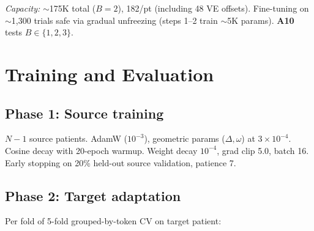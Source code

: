 \documentclass[11pt,letterpaper]{article}
\begin{document}
\textcolor{BrickRed}{\textit{Capacity:}} ${\sim}$175K total ($B{=}2$), 182/pt (including 48 VE offsets). Fine-tuning on ${\sim}$1{,}300 trials safe via gradual unfreezing (steps 1--2 train ${\sim}$5K params). \textbf{A10} tests $B \in \{1, 2, 3\}$.



\section{Training and Evaluation}\label{sec:training}

\subsection{Phase 1: Source training}

$N{-}1$ source patients. AdamW ($10^{-3}$), geometric params ($\Delta, \omega$) at $3 \times 10^{-4}$. Cosine decay with 20-epoch warmup. Weight decay $10^{-4}$, grad clip 5.0, batch 16. Early stopping on 20\% held-out source validation, patience 7.

\subsection{Phase 2: Target adaptation}

Per fold of 5-fold grouped-by-token CV on target patient:
\end{document}
